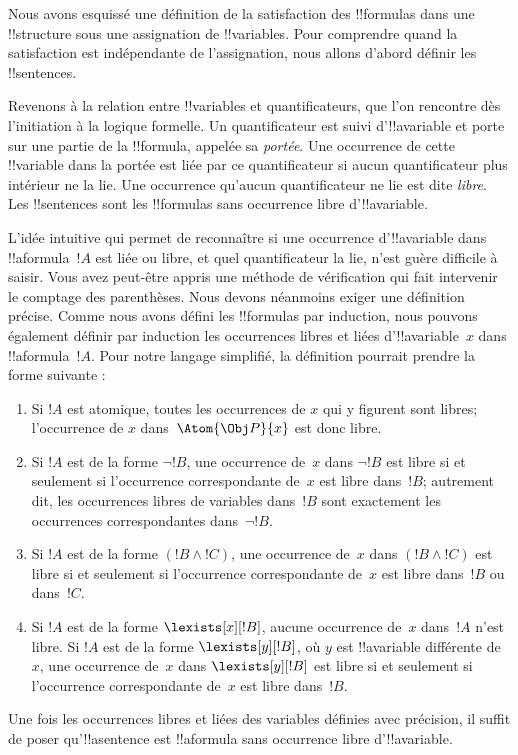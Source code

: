 \documentclass[../../../include/open-logic-section]{subfiles}
\begin{document}


Nous avons esquissé une définition de la satisfaction des !!{formula}s
dans une !!{structure} sous une assignation de !!{variable}s. Pour
comprendre quand la satisfaction est indépendante de l'assignation,
nous allons d'abord définir les !!{sentence}s.

Revenons à la relation entre !!{variable}s et quantificateurs,
que l'on rencontre dès l'initiation à la logique formelle. Un
quantificateur est suivi d'!!a{variable} et porte sur une partie de
la !!{formula}, appelée sa \emph{portée}. Une occurrence de cette
!!{variable} dans la portée est liée par ce quantificateur si aucun
quantificateur plus intérieur ne la lie. Une occurrence qu'aucun
quantificateur ne lie est dite \emph{libre}. Les !!{sentence}s sont
les !!{formula}s sans occurrence libre d'!!a{variable}.

L'idée intuitive qui permet de reconnaître si une occurrence
d'!!a{variable} dans !!a{formula}~$!A$ est liée ou libre, et quel
quantificateur la lie, n'est guère difficile à saisir. Vous avez
peut-être appris une méthode de vérification qui fait intervenir le
comptage des parenthèses. Nous devons néanmoins exiger une définition
précise. Comme nous avons défini les !!{formula}s par induction, nous
pouvons également définir par induction les occurrences libres et
liées d'!!a{variable}~$x$ dans !!a{formula}~$!A$. Pour notre langage
simplifié, la définition pourrait prendre la forme suivante :
\begin{enumerate}
  \item Si $!A$ est atomique, toutes les occurrences de $x$ qui y
  figurent sont libres; l'occurrence de $x$ dans~$\Atom{\Obj P}{x}$ est
  donc libre.
  \item Si $!A$ est de la forme $\lnot !B$, une occurrence de~$x$ dans
  $\lnot !B$ est libre si et seulement si l'occurrence correspondante
  de~$x$ est libre dans~$!B$; autrement dit, les occurrences libres de
  variables dans~$!B$ sont exactement les occurrences correspondantes
  dans~$\lnot !B$.
  \item Si $!A$ est de la forme $(!B \land !C)$, une occurrence de~$x$
  dans $(!B \land !C)$ est libre si et seulement si l'occurrence
  correspondante de~$x$ est libre dans~$!B$ ou dans~$!C$.
  \item Si $!A$ est de la forme $\lexists[x][!B]$, aucune occurrence
  de~$x$ dans~$!A$ n'est libre. Si $!A$ est de la forme
  $\lexists[y][!B]$, où $y$ est !!a{variable} différente de~$x$, une
  occurrence de~$x$ dans $\lexists[y][!B]$ est libre si et seulement
  si l'occurrence correspondante de~$x$ est libre dans~$!B$.
\end{enumerate}

Une fois les occurrences libres et liées des variables définies avec
précision, il suffit de poser qu'!!a{sentence} est !!a{formula} sans
occurrence libre d'!!a{variable}.
\end{document}
